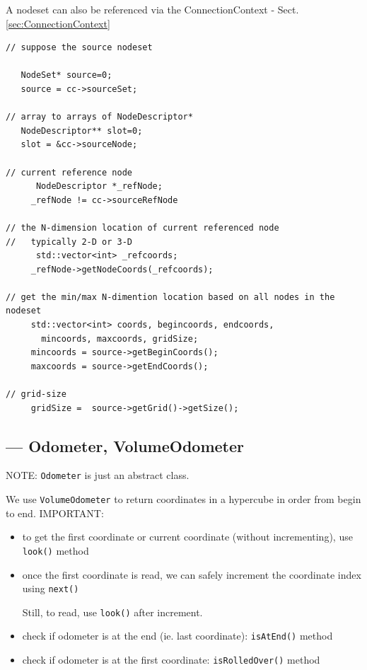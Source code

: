 A nodeset can also be referenced via the ConnectionContext -
Sect.\ref{sec:ConnectionContext}
\begin{lstlisting}
// suppose the source nodeset

   NodeSet* source=0;
   source = cc->sourceSet;

// array to arrays of NodeDescriptor*
   NodeDescriptor** slot=0;
   slot = &cc->sourceNode;

// current reference node 
      NodeDescriptor *_refNode;
     _refNode != cc->sourceRefNode
     
// the N-dimension location of current referenced node
//   typically 2-D or 3-D
      std::vector<int> _refcoords;
     _refNode->getNodeCoords(_refcoords);

// get the min/max N-dimention location based on all nodes in the nodeset
     std::vector<int> coords, begincoords, endcoords, 
       mincoords, maxcoords, gridSize;
     mincoords = source->getBeginCoords();
     maxcoords = source->getEndCoords();

// grid-size
     gridSize =  source->getGrid()->getSize();

\end{lstlisting}

\subsection{--- Odometer, VolumeOdometer}
\label{sec:Odometer}
\label{sec:VolumeOdometer}

NOTE: \verb!Odometer! is just an abstract class.

We use \verb!VolumeOdometer! to return
coordinates in a hypercube in order from begin to end. 
IMPORTANT:
\begin{itemize}
  \item to get the first coordinate or current coordinate (without
  incrementing), use \verb!look()! method
  
  
  \item once the first coordinate is read, we can safely increment the
  coordinate index using \verb!next()!
  
  Still, to read, use \verb!look()! after increment.
  
  \item check if odometer is at the end (ie. last coordinate): \verb!isAtEnd()!
  method
  
  \item check if odometer is at the first coordinate: \verb!isRolledOver()!
  method
\end{itemize}

